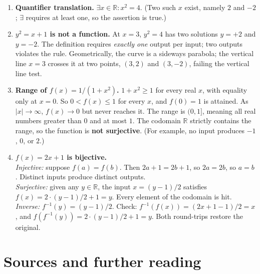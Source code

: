 \begin{enumerate}
  \item \textbf{Quantifier translation.} $\exists x \in \mathbb{R} \colon x^2 = 4$. (Two such $x$ exist, namely $2$ and $-2$; $\exists$ requires at least one, so the assertion is true.)

  \item \textbf{$y^2 = x + 1$ is not a function.} At $x = 3$, $y^2 = 4$ has two solutions $y = +2$ and $y = -2$. The definition requires \emph{exactly one} output per input; two outputs violates the rule. Geometrically, the curve is a sideways parabola; the vertical line $x = 3$ crosses it at two points, $(3, 2)$ and $(3, -2)$, failing the vertical line test.

  \item \textbf{Range of $f(x) = 1/(1 + x^2)$.} $1 + x^2 \geq 1$ for every real $x$, with equality only at $x = 0$. So $0 < f(x) \leq 1$ for every $x$, and $f(0) = 1$ is attained. As $|x| \to \infty$, $f(x) \to 0$ but never reaches it. The range is $(0, 1]$, meaning all real numbers greater than $0$ and at most $1$. The codomain $\mathbb{R}$ strictly contains the range, so the function is \textbf{not surjective}. (For example, no input produces $-1$, $0$, or $2$.)

  \item \textbf{$f(x) = 2x + 1$ is bijective.} \\
    \emph{Injective:} suppose $f(a) = f(b)$. Then $2a + 1 = 2b + 1$, so $2a = 2b$, so $a = b$. Distinct inputs produce distinct outputs. \\
    \emph{Surjective:} given any $y \in \mathbb{R}$, the input $x = (y - 1)/2$ satisfies $f(x) = 2 \cdot (y - 1)/2 + 1 = y$. Every element of the codomain is hit. \\
    \emph{Inverse:} $f^{-1}(y) = (y - 1)/2$. Check: $f^{-1}(f(x)) = (2x + 1 - 1)/2 = x$, and $f(f^{-1}(y)) = 2 \cdot (y - 1)/2 + 1 = y$. Both round-trips restore the original.
\end{enumerate}


\section*{Sources and further reading}

